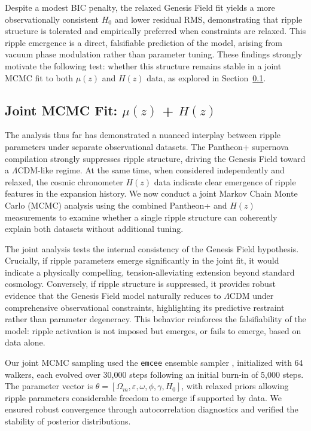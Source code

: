 Despite a modest BIC penalty, the relaxed Genesis Field fit yields a more observationally consistent $H_0$ and lower residual RMS, demonstrating that ripple structure is tolerated and empirically preferred when constraints are relaxed. This ripple emergence is a direct, falsifiable prediction of the model, arising from vacuum phase modulation rather than parameter tuning. These findings strongly motivate the following test: whether this structure remains stable in a joint MCMC fit to both $\mu(z)$ and $H(z)$ data, as explored in Section~\ref{sec:joint_fit}.

\subsection{Joint MCMC Fit: \texorpdfstring{$\mu(z)$ + $H(z)$}{mu(z) + H(z)}}
\label{sec:joint_fit}

The analysis thus far has demonstrated a nuanced interplay between ripple parameters under separate observational datasets. The Pantheon+ supernova compilation strongly suppresses ripple structure, driving the Genesis Field toward a $\Lambda$CDM-like regime. At the same time, when considered independently and relaxed, the cosmic chronometer $H(z)$ data indicate clear emergence of ripple features in the expansion history. We now conduct a joint Markov Chain Monte Carlo (MCMC) analysis using the combined Pantheon+ and $H(z)$ measurements to examine whether a single ripple structure can coherently explain both datasets without additional tuning.

The joint analysis tests the internal consistency of the Genesis Field hypothesis. Crucially, if ripple parameters emerge significantly in the joint fit, it would indicate a physically compelling, tension-alleviating extension beyond standard cosmology. Conversely, if ripple structure is suppressed, it provides robust evidence that the Genesis Field model naturally reduces to $\Lambda$CDM under comprehensive observational constraints, highlighting its predictive restraint rather than parameter degeneracy. This behavior reinforces the falsifiability of the model: ripple activation is not imposed but emerges, or fails to emerge, based on data alone.

Our joint MCMC sampling used the \texttt{emcee} ensemble sampler \cite{ForemanMackey2013}, initialized with 64 walkers, each evolved over 30,000 steps following an initial burn-in of 5,000 steps. The parameter vector is $\theta = [\Omega_m, \varepsilon, \omega, \phi, \gamma, H_0]$, with relaxed priors allowing ripple parameters considerable freedom to emerge if supported by data. We ensured robust convergence through autocorrelation diagnostics and verified the stability of posterior distributions.

